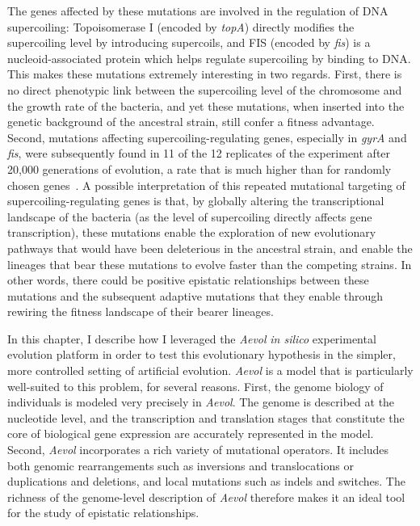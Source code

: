 The genes affected by these mutations are involved in the regulation of DNA supercoiling: Topoisomerase I (encoded by \emph{topA}) directly modifies the supercoiling level by introducing supercoils, and FIS (encoded by \emph{fis}) is a nucleoid-associated protein which helps regulate supercoiling by binding to DNA.
This makes these mutations extremely interesting in two regards.
First, there is no direct phenotypic link between the supercoiling level of the chromosome and the growth rate of the bacteria, and yet these mutations, when inserted into the genetic background of the ancestral strain, still confer a fitness advantage.
Second, mutations affecting supercoiling-regulating genes, especially in \emph{gyrA} and \emph{fis}, were subsequently found in 11 of the 12 replicates of the experiment after 20,000 generations of evolution, a rate that is much higher than for randomly chosen genes~\citep{crozat2010}.
A possible interpretation of this repeated mutational targeting of supercoiling-regulating genes is that, by globally altering the transcriptional landscape of the bacteria (as the level of supercoiling directly affects gene transcription), these mutations enable the exploration of new evolutionary pathways that would have been deleterious in the ancestral strain, and enable the lineages that bear these mutations to evolve faster than the competing strains.
In other words, there could be positive epistatic relationships between these mutations and the subsequent adaptive mutations that they enable through rewiring the fitness landscape of their bearer lineages.

In this chapter, I describe how I leveraged the \emph{Aevol} \emph{in silico} experimental evolution platform in order to test this evolutionary hypothesis in the simpler, more controlled setting of artificial evolution.
\emph{Aevol} is a model that is particularly well-suited to this problem, for several reasons.
First, the genome biology of individuals is modeled very precisely in \emph{Aevol}.
The genome is described at the nucleotide level, and the transcription and translation stages that constitute the core of biological gene expression are accurately represented in the model.
Second, \emph{Aevol} incorporates a rich variety of mutational operators.
It includes both genomic rearrangements such as inversions and translocations or duplications and deletions, and local mutations such as indels and switches.
The richness of the genome-level description of \emph{Aevol} therefore makes it an ideal tool for the study of epistatic relationships.

